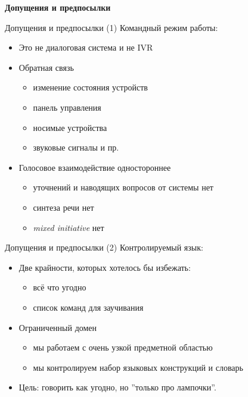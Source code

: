 \documentclass{beamer}
\begin{document}
\begin{frame}{}
\begin{center}
	\textbf{Допущения и предпосылки}\\
\end{center}
\end{frame}

\begin{frame}{Допущения и предпосылки (1)}
Командный режим работы:\\
\bigskip
\begin{itemize}
	\item Это не диалоговая система и не IVR
	\item Обратная связь
		\begin{itemize}
			\item изменение состояния устройств 
			\item панель управления
			\item носимые устройства 
			\item звуковые сигналы и пр.
		\end{itemize}
	\item Голосовое взаимодействие одностороннее
		\begin{itemize}
			\item уточнений и наводящих вопросов от системы нет
			\item синтеза речи нет
			\item \textit{mixed initiative} нет
		\end{itemize}
\end{itemize}
\end{frame}

\begin{frame}{Допущения и предпосылки (2)}
Контролируемый язык:\\
\bigskip
\begin{itemize}
	\item Две крайности, которых хотелось бы избежать:
		\begin{itemize}
			\item всё что угодно 
			\item список команд для заучивания
		\end{itemize}
	\item Ограниченный домен
		\begin{itemize}
			\item мы работаем с очень узкой предметной областью
			\item мы контролируем набор языковых конструкций и словарь
		\end{itemize}
	\item Цель: говорить как угодно, но ''только про лампочки''.
\end{itemize}
\end{frame}
\end{document}
